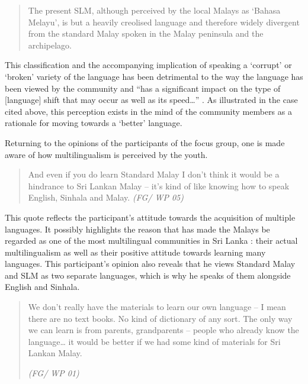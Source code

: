 \begin{quote}
The present SLM, although perceived by the local Malays as `Bahasa Melayu', is but a heavily creolised language and therefore widely divergent from the standard Malay spoken in the Malay peninsula and the archipelago. \citep[153]{Hussainmiya1987}
\end{quote}

This classification and the accompanying implication of speaking a `corrupt' or `broken' variety of the language has been detrimental to the way the language has been viewed by the community and ``has a significant impact on the type of [language] shift that may occur as well as its speed{\dots}'' \citep[220]{LimEtAl2007}. As illustrated in the case cited above, this perception exists in the mind of the community members as a rationale for moving towards a `better' language.

Returning to the opinions of the participants of the focus group, one is made aware of how multilingualism is perceived by the youth. 

\begin{quote} 
And even if you do learn Standard Malay I don't think it would be a hindrance to Sri Lankan Malay -- it's kind of like knowing how to speak English, Sinhala and Malay. 
{\itshape
(FG/ WP 05)}
\end{quote}

This quote reflects the participant's attitude towards the acquisition of multiple languages. It possibly highlights the reason that has made the Malays be regarded as one of the most multilingual communities in Sri Lanka \citep{LimEtAl2007, Saldin2001,Vijaycharya2004}: their actual multilingualism as well as their positive attitude towards learning many languages.  This participant's opinion also reveals that he views Standard Malay and SLM as two separate languages, which is why he speaks of them alongside English and Sinhala.

\begin{quote}
{We don}{'}{t really have the materials to learn our own language}{ -- }{I mean there are no text books. No kind of dictionary of any sort. The only way we can learn is from parents, grandparents}{ -- }{people who already know the language}{{\dots}} {it would be better if we had some kind of materials for Sri Lankan Malay.} 

{\itshape
(FG/ WP 01)}

\end{quote}

